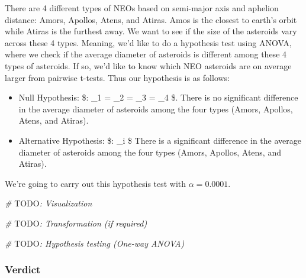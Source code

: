 \documentclass[
]{article}
\newenvironment{Shaded}{\begin{snugshade}}{\end{snugshade}}
\newcommand{\AlertTok}[1]{\textcolor[rgb]{0.94,0.16,0.16}{#1}}
\newcommand{\CommentTok}[1]{\textcolor[rgb]{0.56,0.35,0.01}{\textit{#1}}}
\begin{document}
There are 4 different types of NEOs based on semi-major axis and
aphelion distance: Amors, Apollos, Atens, and Atiras. Amos is the
closest to earth's orbit while Atiras is the furthest away. We want to
see if the size of the asteroids vary across these 4 types. Meaning,
we'd like to do a hypothesis test using ANOVA, where we check if the
average diameter of asteroids is different among these 4 types of
asteroids. If so, we'd like to know which NEO asteroids are on average
larger from pairwise t-tests. Thus our hypothesis is as follows:

\begin{itemize}
\item
  Null Hypothesis: \$: \mu\_1 = \mu\_2 = \mu\_3 = \mu\_4 \$.
  There is no significant difference in the average diameter of
  asteroids among the four types (Amors, Apollos, Atens, and Atiras).
\item
  Alternative Hypothesis: \$:  \mu\_i
   \$ There is a significant difference in the
  average diameter of asteroids among the four types (Amors, Apollos,
  Atens, and Atiras).
\end{itemize}

We're going to carry out this hypothesis test with \(\alpha = 0.0001\).

\begin{Shaded}
\begin{Highlighting}[]
\CommentTok{\# }\AlertTok{TODO}\CommentTok{: Visualization}
\end{Highlighting}
\end{Shaded}

\begin{Shaded}
\begin{Highlighting}[]
\CommentTok{\# }\AlertTok{TODO}\CommentTok{: Transformation (if required)}
\end{Highlighting}
\end{Shaded}

\begin{Shaded}
\begin{Highlighting}[]
\CommentTok{\# }\AlertTok{TODO}\CommentTok{: Hypothesis testing (One{-}way ANOVA)}
\end{Highlighting}
\end{Shaded}

\hypertarget{verdict-3}{%
\subsubsection{Verdict}\label{verdict-3}}
\end{document}
